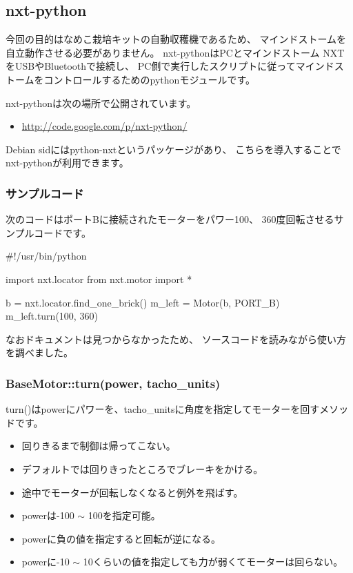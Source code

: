 \documentclass[mingoth,a4paper]{jsarticle}
\begin{document}
\subsection{nxt-python}
今回の目的はなめこ栽培キットの自動収穫機であるため、
マインドストームを自立動作させる必要がありません。
nxt-pythonはPCとマインドストーム NXTをUSBやBluetoothで接続し、
PC側で実行したスクリプトに従ってマインドストームをコントロールするためのpythonモジュールです。

nxt-pythonは次の場所で公開されています。
\begin{itemize}
\item \url{http://code.google.com/p/nxt-python/}
\end{itemize}

Debian sidにはpython-nxtというパッケージがあり、
こちらを導入することでnxt-pythonが利用できます。


\subsubsection{サンプルコード}
次のコードはポートBに接続されたモーターをパワー100、
360度回転させるサンプルコードです。

\begin{commandline}
#!/usr/bin/python

import nxt.locator
from nxt.motor import *

b = nxt.locator.find_one_brick()
m_left = Motor(b, PORT_B)
m_left.turn(100, 360)
\end{commandline}

なおドキュメントは見つからなかったため、
ソースコードを読みながら使い方を調べました。

\subsubsection{BaseMotor::turn(power, tacho\_units)}

turn()はpowerにパワーを、tacho\_unitsに角度を指定してモーターを回すメソッドです。
\begin{itemize}
\item 回りきるまで制御は帰ってこない。
\item デフォルトでは回りきったところでブレーキをかける。
\item 途中でモーターが回転しなくなると例外を飛ばす。
\item powerは-100 $\sim$ 100を指定可能。
\item powerに負の値を指定すると回転が逆になる。
\item powerに-10 $\sim$ 10くらいの値を指定しても力が弱くてモーターは回らない。
\end{itemize}
\end{document}
